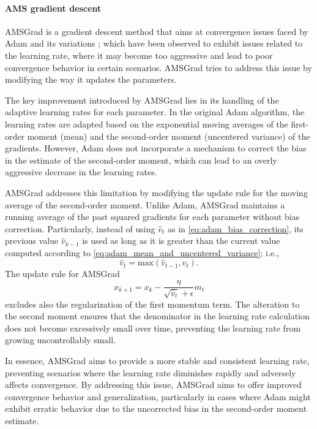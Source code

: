 \paragraph{AMS gradient descent}


AMSGrad is a gradient descent method that aims at convergence issues faced by Adam and its variations \cite{Reddi2019convergenceadam}; which have been observed to exhibit issues related to the learning rate, where it may become too aggressive and lead to poor convergence behavior in certain scenarios. AMSGrad tries to address this issue by modifying the way it updates the parameters. 

The key improvement introduced by AMSGrad lies in its handling of the adaptive learning rates for each parameter. In the original Adam algorithm, the learning rates are adapted based on the exponential moving averages of the first-order moment (mean) and the second-order moment (uncentered variance) of the gradients. However, Adam does not incorporate a mechanism to correct the bias in the estimate of the second-order moment, which can lead to an overly aggressive decrease in the learning rates.

AMSGrad addresses this limitation by modifying the update rule for the moving average of the second-order moment. Unlike Adam, AMSGrad maintains a running average of the past squared gradients for each parameter without bias correction. Particularly, instead of using $\hat{v}_t$ as in \eqref{eq:adam_bias_correction}, its previous value $\hat{v}_{k-1}$ is used as long as it is greater than the current value computed according to \eqref{eq:adam_mean_and_uncentered_variance}; i.e.,
\begin{equation}
	\hat{v}_t = \text{max}(\hat{v}_{t-1}, v_t).
\end{equation}
The update rule for AMSGrad 
\begin{equation}
	x_{k+1} = x_{k} - \dfrac{\eta}{\sqrt{\hat{v}_t} + \epsilon} m_t
\end{equation}
excludes also the regularization of the first momentum term. The alteration to the second moment ensures that the denominator in the learning rate calculation does not become excessively small over time, preventing the learning rate from growing uncontrollably small.

In essence, AMSGrad aims to provide a more stable and consistent learning rate, preventing scenarios where the learning rate diminishes rapidly and adversely affects convergence. By addressing this issue, AMSGrad aims to offer improved convergence behavior and generalization, particularly in cases where Adam might exhibit erratic behavior due to the uncorrected bias in the second-order moment estimate.

